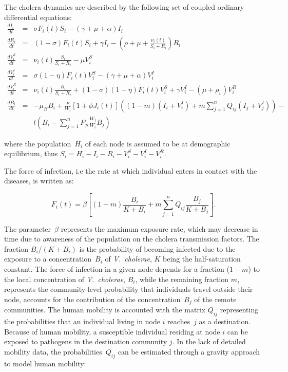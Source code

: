 The cholera dynamics are described by the following set of coupled ordinary differential equations:
\begin{eqnarray}
\frac{dI_i}{dt} &=& \sigma F_i(t) S_i - (\gamma + \mu + \alpha) I_i \label{eq:I2}\\
\frac{dR_i}{dt} &=& (1-\sigma) F_i(t) S_i + \gamma I_i - (\rho + \mu+\frac{\nu_i(t)}{S_i+R_i}) R_i \label{eq:R2}\\
\frac{dV^S_i}{dt} &=& \nu_i(t) \frac{S_i}{S_i+R_i}-\mu V^S_i \label{eq:VS2}\\
\frac{dV^I_i}{dt} &=& \sigma (1-\eta) F_i(t) V^S_i - (\gamma + \mu + \alpha) V^I_i \label{eq:VI2}\\
\frac{dV^R_i}{dt} &=& \nu_i(t) \frac{R_i}{S_i+R_i} + (1-\sigma) (1-\eta) F_i(t) V^S_i + \gamma V^I_i - (\mu+\rho_v) V^R_i \label{eq:VR2}\\
\frac{dB_i}{dt} &=& - \mu_B B_i +\frac{p}{W_i}\left[1 + \phi J_i(t) \right] \left((1-m)(I_i +V_i^I)+m \sum_{j=1}^n Q_{ij} (I_j +V_j^I)\right)- \nonumber \\
&& l \left( B_i - \sum_{j=1}^n P_{ji} \frac{W_j}{W_i} B_j \right)
\end{eqnarray}

where the population~$H_i$ of each node is assumed to be at demographic equilibrium, thus $S_i=H_i-I_i-R_i-V_i^S-V_i^I-V_i^R$.

The force of infection, i.e the rate at which individual enters in contact with the diseases, is written as:

\begin{equation}
F_i(t) = \beta \left[ (1 - m) \frac{B_i}{K + B_i} + m \sum_{j=1}^n Q_{ij} \frac{B_j}{K + B_j} \right].
\label{force}
\end{equation}

The parameter~$\beta$ represents the maximum exposure rate, which may decrease in time due to awareness of the population on the cholera transmission factors\cite{Bertuzzo:ProbabilityExtinctionHaiti:2016}. The fraction $B_{i}/(K+B_{i})$ is the probability of becoming infected due to the exposure to a concentration~$B_i$ of \textit{V.~cholerae}, $K$ being the half-saturation constant\cite{Codeco:EndemicEpidemicDynamics:2001}. The force of infection in a given node depends for a fraction ($1-m$) to the local concentration of \textit{V.~cholerae}, $B_i$, while the remaining fraction $m$, represents the community-level probability that individuals travel outside their node, accounts for the contribution of the concentration~$B_j$ of the remote communities. 
The human mobility is accounted with the matrix $Q_{ij}$ representing the probabilities that an individual living in node $i$ reaches~$j$ as a destination. Because of human mobility, a susceptible individual residing at node $i$ can be exposed to pathogens in the destination community $j$. 
In the lack of detailed mobility data,  the probabilities~$Q_{ij}$ can be estimated through a gravity approach\cite{erlander_gravity_1990} to model human mobility:

